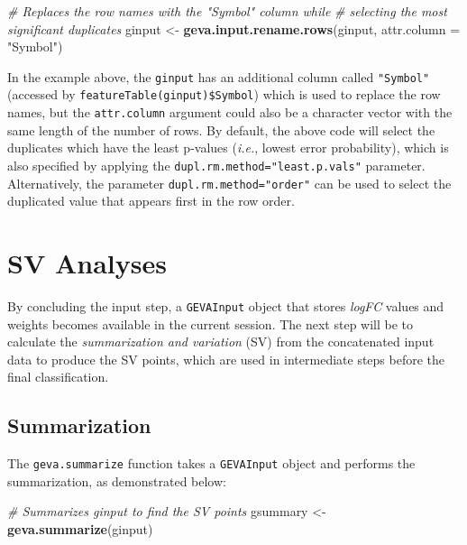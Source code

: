 \documentclass[
  12pt,
]{article}
\newenvironment{Shaded}{\begin{snugshade}}{\end{snugshade}}
\newcommand{\CommentTok}[1]{\textcolor[rgb]{0.56,0.35,0.01}{\textit{#1}}}
\newcommand{\DataTypeTok}[1]{\textcolor[rgb]{0.13,0.29,0.53}{#1}}
\newcommand{\KeywordTok}[1]{\textcolor[rgb]{0.13,0.29,0.53}{\textbf{#1}}}
\newcommand{\NormalTok}[1]{#1}
\newcommand{\StringTok}[1]{\textcolor[rgb]{0.31,0.60,0.02}{#1}}
\begin{document}
\begin{Shaded}
\begin{Highlighting}[]
\CommentTok{# Replaces the row names with the "Symbol" column while}
\CommentTok{# selecting the most significant duplicates}
\NormalTok{ginput <-}\StringTok{ }\KeywordTok{geva.input.rename.rows}\NormalTok{(ginput,}
                                 \DataTypeTok{attr.column =} \StringTok{"Symbol"}\NormalTok{)}
\end{Highlighting}
\end{Shaded}

In the example above, the \texttt{ginput} has an additional column
called \texttt{"Symbol"} (accessed by
\texttt{featureTable(ginput)\$Symbol}) which is used to replace the row
names, but the \texttt{attr.column} argument could also be a character
vector with the same length of the number of rows. By default, the above
code will select the duplicates which have the least p-values
(\emph{i.e.}, lowest error probability), which is also specified by
applying the \texttt{dupl.rm.method="least.p.vals"} parameter.
Alternatively, the parameter \texttt{dupl.rm.method="order"} can be used
to select the duplicated value that appears first in the row order.

\clearpage

\hypertarget{sv-analyses}{%
\section{SV Analyses}\label{sv-analyses}}

By concluding the input step, a \texttt{GEVAInput} object that stores
\emph{logFC} values and weights becomes available in the current
session. The next step will be to calculate the \emph{summarization and
variation} (SV) from the concatenated input data to produce the SV
points, which are used in intermediate steps before the final
classification.

\hypertarget{summarization}{%
\subsection{Summarization}\label{summarization}}

The \texttt{geva.summarize} function takes a \texttt{GEVAInput} object
and performs the summarization, as demonstrated below:

\begin{Shaded}
\begin{Highlighting}[]
\CommentTok{# Summarizes ginput to find the SV points}
\NormalTok{gsummary <-}\StringTok{ }\KeywordTok{geva.summarize}\NormalTok{(ginput)}
\end{Highlighting}
\end{Shaded}
\end{document}
